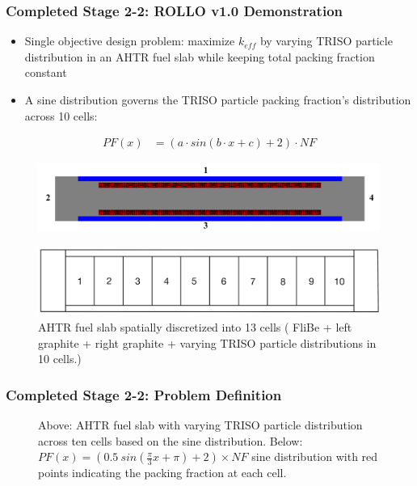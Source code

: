 \begin{frame}
    \frametitle{Completed Stage 2-2: ROLLO v1.0 Demonstration}
    \begin{itemize}
        \item Single objective design problem: maximize $k_{eff}$ by varying 
        TRISO particle distribution in an AHTR fuel slab while keeping total 
        packing fraction constant
        \item A sine distribution governs the TRISO particle packing fraction's 
        distribution across 10 cells:
    \end{itemize}
    \begin{align*}
        PF(x) &= \left(a\cdot sin(b\cdot x + c) + 2\right) \cdot NF
    \end{align*}
    \begin{figure}[]
        \centering
        \includegraphics[width=0.7\linewidth]{../docs/figures/straightened_slab.png} 
    \end{figure}
    \begin{figure}[]
        \includegraphics[width=0.7\linewidth]{figures/straightened_slab_mg_small.png}
        \caption{AHTR fuel slab spatially discretized into 13 cells ( FliBe + left graphite 
        + right graphite + varying TRISO particle distributions in 10 cells.)}
    \end{figure}
\end{frame}

\begin{frame}
    \frametitle{Completed Stage 2-2: Problem Definition}
    \begin{figure}[]
        \centering
        \caption{Above: AHTR fuel slab with varying TRISO particle 
        distribution across ten cells based on the sine distribution. 
        Below: $PF(x) = (0.5\ sin(\frac{\pi}{3}x + \pi) + 2)  \times NF$ 
        sine distribution with red points indicating the packing fraction at each cell.}
    \end{figure}
\end{frame}

